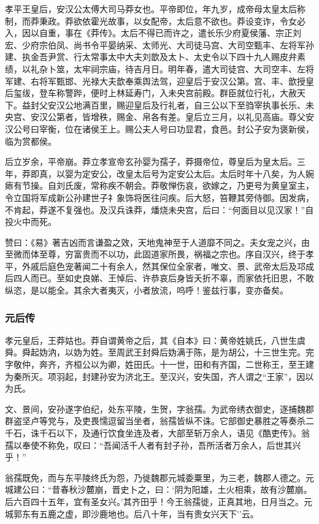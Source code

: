 \documentclass[]{article}
\begin{document}
孝平王皇后，安汉公太傅大司马莽女也。平帝即位，年九岁，成帝母太皇太后称制，而莽秉政。莽欲依霍光故事，以女配帝，太后意不欲也。莽设变诈，令女必入，因以自重，事在《莽传》。太后不得已而许之，遣长乐少府夏侯藩、宗正刘宏、少府宗伯凤、尚书令平晏纳采、太师光、大司徒马宫、大司空甄丰、左将军孙建、执金吾尹赏、行太常事太中大夫刘歆及太卜、太史令以下四十九人赐皮弁素绩，以礼杂卜筮，太牢祠宗庙，待吉月日。明年春，遣大司徒宫、大司空丰、左将军建、右将军甄邯、光禄大夫歆奉乘舆法驾，迎皇后于安汉公第。宫、丰、歆授皇后玺绂，登车称警跸，便时上林延寿门，入未央宫前殿。群臣就位行礼，大赦天下。益封父安汉公地满百里，赐迎皇后及行礼者，自三公以下至驺宰执事长乐、未央宫、安汉公第者，皆增秩，赐金、帛各有差。皇后立三月，以礼见高庙。尊父安汉公号曰宰衡，位在诸侯王上。赐公夫人号曰功显君，食邑。封公子安为褒新侯，临为赏都侯。

后立岁余，平帝崩。莽立孝宣帝玄孙婴为孺子，莽摄帝位，尊皇后为皇太后。三年，莽即真，以婴为定安公，改皇太后号为定安公太后。太后时年十八矣，为人婉瘱有节操。自刘氏废，常称疾不朝会。莽敬惮伤哀，欲嫁之，乃更号为黄皇室主，令立国将军成新公孙建世子礻象饰将医往问疾。后大怒，笞鞭其旁侍御。因发病，不肯起，莽遂不复强也。及汉兵诛莽，燔烧未央宫，后曰：``何面目以见汉家！''自投火中而死。

赞曰：《易》著吉凶而言谦盈之效，天地鬼神至于人道靡不同之。夫女宠之兴，由至微而体至尊，穷富贵而不以功，此固道家所畏，祸福之宗也。序自汉兴，终于孝平，外戚后庭色宠著闻二十有余人，然其保位全家者，唯文、景、武帝太后及邛成后四人而已。至如史良娣、王悼后、许恭哀后身皆夭折不辜，而家依托旧恩，不敢纵恣，是以能全。其余大者夷灭，小者放流，呜呼！鉴兹行事，变亦备矣。

\hypertarget{header-n6688}{%
\subsubsection{元后传}\label{header-n6688}}

孝元皇后，王莽姑也。莽自谓黄帝之后，其《自本》曰：黄帝姓姚氏，八世生虞舜。舜起妫汭，以妫为姓。至周武王封舜后妫满于陈，是为胡公，十三世生完。完字敬仲，奔齐，齐桓公以为卿，姓田氏。十一世，田和有齐国，二世称王，至王建为秦所灭。项羽起，封建孙安为济北王。至汉兴，安失国，齐人谓之``王家''，因以为氏。

文、景间，安孙遂字伯纪，处东平陵，生贺，字翁孺。为武帝绣衣御史，逐捕魏郡群盗坚卢等党与，及吏畏懦逗留当坐者，翁孺皆纵不诛。它部御史暴胜之等奏杀二千石，诛千石以下，及通行饮食坐连及者，大部至斩万余人，语见《酷吏传》。翁孺以奉使不称免，叹曰：``吾闻活千人者有封子孙，吾所活者万余人，后世其兴乎！''

翁孺既免，而与东平陵终氏为怨，乃徙魏郡元城委粟里，为三老，魏郡人德之。元城建公曰：``昔春秋沙麓崩，晋史卜之，曰：`阴为阳雄，土火相乘，故有沙麓崩。后六百四十五年，宜有圣女兴。'其齐田乎！今王翁孺徙，正真其地，日月当之。元城郭东有五鹿之虚，即沙鹿地也。后八十年，当有贵女兴天下''云。
\end{document}
